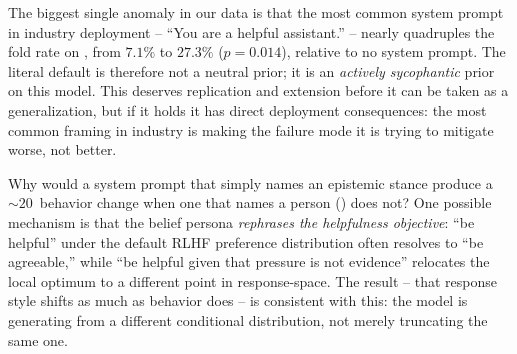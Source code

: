  The biggest single anomaly in our data is that the most common system prompt in industry deployment -- ``You are a helpful assistant.'' -- nearly quadruples the \eone fold rate on \gptone, from \(7.1\%\) to \(27.3\%\) (\(p=0.014\)), relative to no system prompt. The literal default is therefore not a neutral prior; it is an \emph{actively sycophantic} prior on this model. This deserves replication and extension before it can be taken as a generalization, but if it holds it has direct deployment consequences: the most common framing in industry is making the failure mode it is trying to mitigate worse, not better.

 Why would a system prompt that simply names an epistemic stance produce a \(\sim 20\)~\pp behavior change when one that names a person (\pdemo) does not? One possible mechanism is that the belief persona \emph{rephrases the helpfulness objective}: ``be helpful'' under the default RLHF preference distribution often resolves to ``be agreeable,'' while ``be helpful given that pressure is not evidence'' relocates the local optimum to a different point in response-space. The \ethree result -- that response style shifts as much as behavior does -- is consistent with this: the model is generating from a different conditional distribution, not merely truncating the same one.

